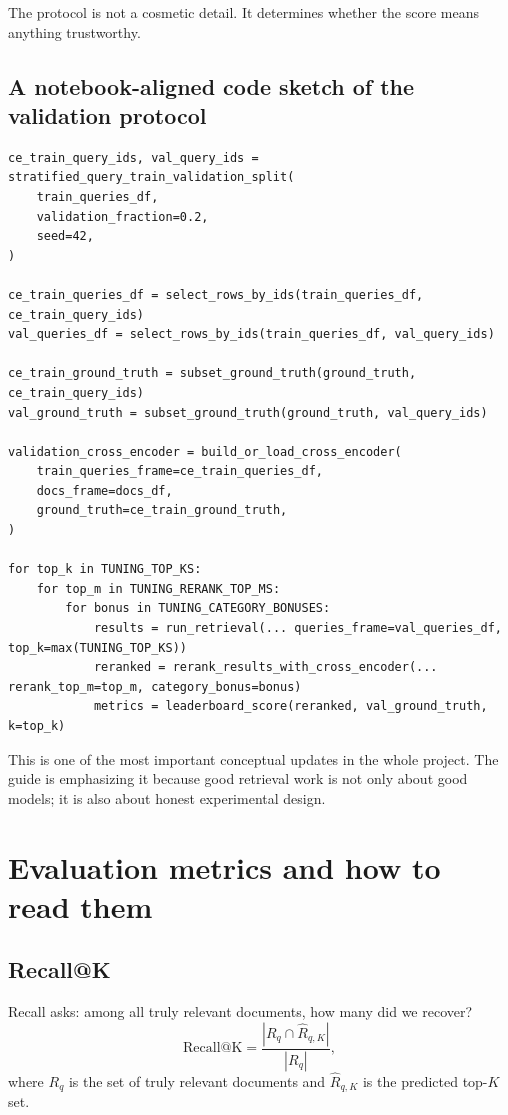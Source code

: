 \documentclass[10pt]{article}
\begin{document}
The protocol is not a cosmetic detail. It determines whether the score means anything trustworthy.

\subsection{A notebook-aligned code sketch of the validation protocol}

\begin{lstlisting}[caption={Simplified leakage-safe tuning loop}]
ce_train_query_ids, val_query_ids = stratified_query_train_validation_split(
    train_queries_df,
    validation_fraction=0.2,
    seed=42,
)

ce_train_queries_df = select_rows_by_ids(train_queries_df, ce_train_query_ids)
val_queries_df = select_rows_by_ids(train_queries_df, val_query_ids)

ce_train_ground_truth = subset_ground_truth(ground_truth, ce_train_query_ids)
val_ground_truth = subset_ground_truth(ground_truth, val_query_ids)

validation_cross_encoder = build_or_load_cross_encoder(
    train_queries_frame=ce_train_queries_df,
    docs_frame=docs_df,
    ground_truth=ce_train_ground_truth,
)

for top_k in TUNING_TOP_KS:
    for top_m in TUNING_RERANK_TOP_MS:
        for bonus in TUNING_CATEGORY_BONUSES:
            results = run_retrieval(... queries_frame=val_queries_df, top_k=max(TUNING_TOP_KS))
            reranked = rerank_results_with_cross_encoder(... rerank_top_m=top_m, category_bonus=bonus)
            metrics = leaderboard_score(reranked, val_ground_truth, k=top_k)
\end{lstlisting}

This is one of the most important conceptual updates in the whole project. The guide is emphasizing it because good retrieval work is not only about good models; it is also about honest experimental design.

\section{Evaluation metrics and how to read them}
\label{sec:metrics}

\subsection{Recall@K}

Recall asks: among all truly relevant documents, how many did we recover?
\[
\mathrm{Recall@K} = \frac{|R_q \cap \hat{R}_{q,K}|}{|R_q|},
\]
where \(R_q\) is the set of truly relevant documents and \(\hat{R}_{q,K}\) is the predicted top-\(K\) set.
\end{document}
